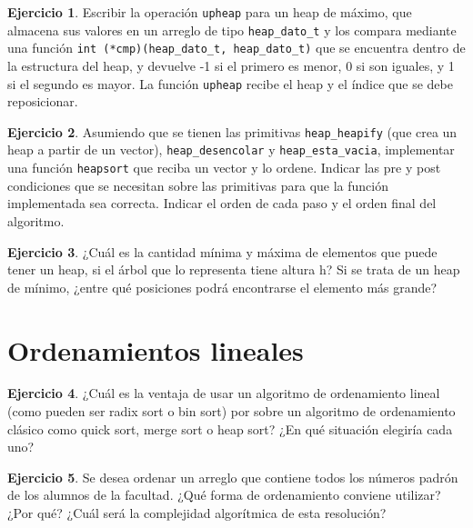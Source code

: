 \documentclass[11pt,a4paper]{article}
\theoremstyle{definition}
\newtheorem{ejercicio}{Ejercicio}[section]
\begin{document}
\begin{ejercicio}
Escribir la operación \lstinline!upheap! para un heap de máximo, que
almacena sus valores en un arreglo de tipo \lstinline!heap_dato_t! y los compara
mediante una función \lstinline!int (*cmp)(heap_dato_t, heap_dato_t)! que se
encuentra dentro de la estructura del heap, y devuelve -1 si el primero es
menor, 0 si son iguales, y 1 si el segundo es mayor. La función
\lstinline!upheap! recibe el heap y el índice que se debe reposicionar.
\end{ejercicio}

\begin{ejercicio}
Asumiendo que se tienen las primitivas \lstinline!heap_heapify! (que
crea un heap a partir de un vector), \lstinline!heap_desencolar! y
\lstinline!heap_esta_vacia!, implementar una función \lstinline!heapsort!
que reciba un vector y lo ordene. Indicar las pre y post condiciones que se
necesitan sobre las primitivas para que la función implementada sea
correcta. Indicar el orden de cada paso y el orden final del algoritmo.
\end{ejercicio}

\begin{ejercicio}
¿Cuál es la cantidad mínima y máxima de elementos que puede tener un
heap, si el árbol que lo representa tiene altura h? Si se trata de un heap
de mínimo, ¿entre qué posiciones podrá encontrarse el elemento más grande?
\end{ejercicio}

\newpage
\section{Ordenamientos lineales}

\begin{ejercicio}
¿Cuál es la ventaja de usar un algoritmo de ordenamiento lineal
(como pueden ser radix sort o bin sort) por sobre un algoritmo de
ordenamiento clásico como quick sort, merge sort o heap sort?  ¿En qué
situación elegiría cada uno?
\end{ejercicio}

\begin{ejercicio}
Se desea ordenar un arreglo que contiene todos los números padrón de los
alumnos de la facultad. ¿Qué forma de ordenamiento conviene utilizar? ¿Por
qué? ¿Cuál será la complejidad algorítmica de esta resolución?
\end{ejercicio}
\end{document}
